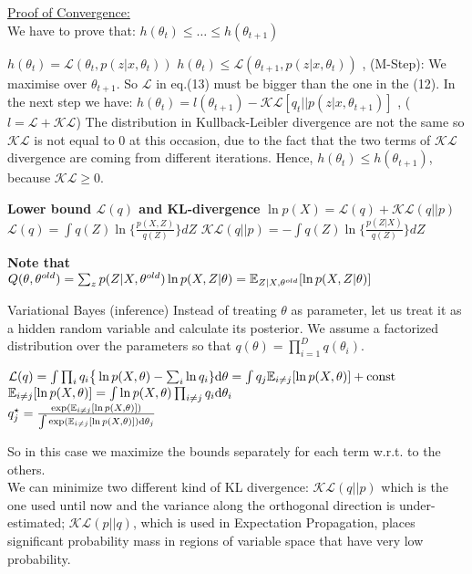 \documentclass[a4paper,landscape]{amsmlaj}
\makeatletter
\renewcommand{\subsection}{\@startsection{subsection}{2}{0mm}
	{-1ex plus -.5ex minus -.2ex}
	{0.1ex plus .2ex}
	{\normalfont\normalsize\bfseries}}
\makeatother
\begin{document}
\begin{multicols*}{3}
\underline{Proof of Convergence:}\\
We have to prove that:
$h(\theta_{t}) \leq \ldots \leq h(\theta_{t+1})$

$h(\theta_{t}) = \mathcal{L}(\theta_{t},p(z|x,\theta_{t}))$
$h(\theta_{t}) \leq \mathcal{L}(\theta_{t+1},p(z|x,\theta_{t}))$
, (M-Step): We maximise over $\theta_{t+1}$. So $\mathcal{L}$ in eq.(13) must be bigger
than the one in the (12). In the next step we have:
$h(\theta_{t}) = l(\theta_{t+1})-\mathcal{KL}[q_{t}||p(z|x,\theta_{t+1})]$
, ($l=\mathcal{L}+\mathcal{KL}$) The distribution in Kullback-Leibler divergence are not
the same so $\mathcal{KL}$ is not equal to $0$ at this occasion, due to the
fact that the two terms of $\mathcal{KL}$ divergence are coming from different
iterations. Hence, $h(\theta_{t}) \leq h(\theta_{t+1})$, because $\mathcal{KL} \geq 0$.

\textbf{Lower bound $\mathcal{L}(q)$ and KL-divergence}
$\ln p(X) = \mathcal{L}(q) + \mathcal{KL}(q||p)$\\
$\mathcal{L} (q) = \int q(Z) \ln \big\{ \frac{p(X,Z)}{q(Z)} \big\} dZ$
\quad
$\mathcal{KL}(q||p) = - \int q(Z) \ln \big\{ \frac{p(Z|X)}{q(Z)} \big\} dZ$

\textbf{Note that}\\
$Q(\theta,\theta^{old}) = \sum_z p(Z|X,\theta^{old}) \ln p(X,Z|\theta)
= \mathbb{E}_{Z|X,\theta^{old}}[\ln p(X,Z|\theta)]$

\subsection{Variational Bayes (inference)}
Instead of treating $\theta$ as parameter, let us treat it as a hidden random
variable and calculate its posterior. We assume a factorized distribution over
the parameters so that $q(\theta)=\prod_{i=1}^D q(\theta_i)$.

$\mathcal{L}(q)
	= \int \prod_i q_i \big\{ \ln p(X,\theta) - \sum_i \ln q_i \}\mathrm{d}\theta
	= \int q_j \mathbb{E}_{i\neq j}[\ln p(X,\theta)] + \text{const}$ \\
$\mathbb{E}_{i\neq j}[\ln p(X,\theta)] = \int \ln p(X,\theta) \prod_{i\neq j}q_i\mathrm{d}\theta_i$ \\
$q_j^\star = \frac{\exp(\mathbb{E}_{i\neq j} [\ln p(X,\theta)] ) }
	{\int \exp(\mathbb{E}_{i\neq j}[\ln p(X,\theta)]) \mathrm{d}\theta_j}$

So in this case we maximize the bounds separately for each term w.r.t. to the others. \\
We can minimize two different kind of KL divergence: $\mathcal{KL}(q||p)$ which
is the one used until now and the variance along the orthogonal direction is
under-estimated; $\mathcal{KL}(p||q)$, which is used in Expectation Propagation,
places significant probability mass in regions of variable space that have very low probability.



\end{multicols*}
\end{document}
